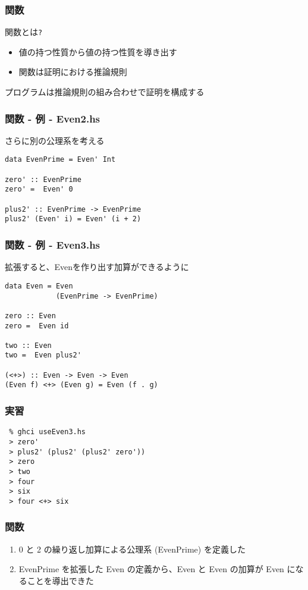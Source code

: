 \documentclass[cjk,dvipdfm,14pt]{beamer}
\begin{document}
\begin{frame}[fragile]
\frametitle{関数}

関数とは\verb|?|
\begin{itemize}
\item 値の持つ性質から値の持つ性質を導き出す
\item 関数は証明における推論規則
\end{itemize}

{ \color{red} プログラムは推論規則の組み合わせで証明を構成する }

\end{frame}

\begin{frame}[fragile]
\frametitle{関数 - 例 - Even2.hs}

さらに別の公理系を考える
\begin{lstlisting}
data EvenPrime = Even' Int

zero' :: EvenPrime
zero' =  Even' 0

plus2' :: EvenPrime -> EvenPrime
plus2' (Even' i) = Even' (i + 2)
\end{lstlisting}

\end{frame}

\begin{frame}[fragile]
\frametitle{関数 - 例 - Even3.hs}

拡張すると、Evenを作り出す加算ができるように
\begin{lstlisting}
data Even = Even
            (EvenPrime -> EvenPrime)

zero :: Even
zero =  Even id

two :: Even
two =  Even plus2'

(<+>) :: Even -> Even -> Even
(Even f) <+> (Even g) = Even (f . g)
\end{lstlisting}

\end{frame}

\begin{frame}[fragile]
\frametitle{実習}

\begin{lstlisting}
 % ghci useEven3.hs
 > zero'
 > plus2' (plus2' (plus2' zero'))
 > zero
 > two
 > four
 > six
 > four <+> six
\end{lstlisting}

\end{frame}

\begin{frame}[fragile]
\frametitle{関数}

\begin{enumerate}
\item 0 と 2 の繰り返し加算による公理系 (EvenPrime) を定義した
\item EvenPrime を拡張した Even の定義から、Even と Even の加算が Even になることを導出できた
\end{enumerate}

\end{frame}
\end{document}
